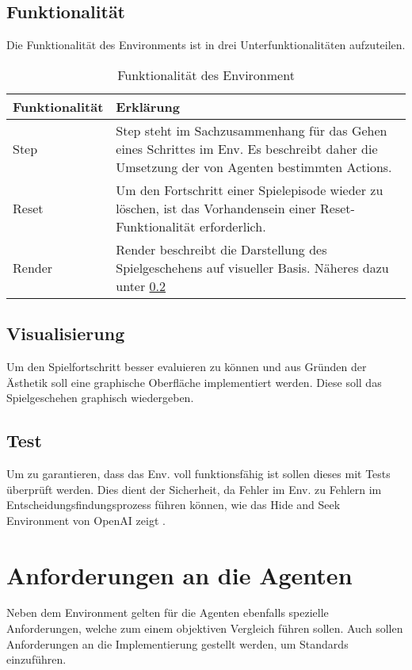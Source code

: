 \subsection{Funktionalität} \label{sec:funktionalität_Env}
Die Funktionalität des Environments ist in drei Unterfunktionalitäten aufzuteilen.
\begin{longtable}[h]{|p{4cm}|p{\linewidth - 5cm}|}
	\caption{Funktionalität des Environment}
	\label{tab:Funktionalität_Env} 
	\endfirsthead
	\endhead
	\hline
	Funktionalität & Erklärung \\
	\hline
	Step & Step steht im Sachzusammenhang für das Gehen eines Schrittes im Env. Es beschreibt daher die Umsetzung der von Agenten bestimmten Actions. \\
	\hline
	Reset & Um den Fortschritt einer Spielepisode wieder zu löschen, ist das Vorhandensein einer Reset-Funktionalität erforderlich. \\
	\hline
	Render & Render beschreibt die Darstellung des Spielgeschehens auf visueller Basis. Näheres dazu unter \ref{sec:visualisierung_Env} \\
	\hline
\end{longtable}

\subsection{Visualisierung} \label{sec:visualisierung_Env}
Um den Spielfortschritt besser evaluieren zu können und aus Gründen der Ästhetik soll eine graphische Oberfläche implementiert werden. Diese soll das Spielgeschehen graphisch wiedergeben.

\subsection{Test}
Um zu garantieren, dass das Env. voll funktionsfähig ist sollen dieses mit Tests überprüft werden. Dies dient der Sicherheit, da Fehler im Env. zu Fehlern im Entscheidungsfindungsprozess führen können, wie das Hide and Seek Environment von OpenAI zeigt \cite{DBLP:journals/corr/abs-1909-07528}.

\section{Anforderungen an die Agenten}
Neben dem Environment gelten für die Agenten ebenfalls spezielle Anforderungen, welche zum einem objektiven Vergleich führen sollen. Auch sollen Anforderungen an die Implementierung gestellt werden, um Standards einzuführen.

